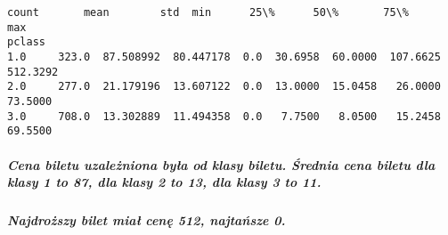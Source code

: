 \documentclass[11pt]{article}
\makeatletter
\newcommand{\boxspacing}{\kern\kvtcb@left@rule\kern\kvtcb@boxsep}
\newcommand{\prompt}[4]{
        {\ttfamily\llap{{\color{#2}[#3]:\hspace{3pt}#4}}\vspace{-\baselineskip}}
    }
\makeatother
\begin{document}
            \begin{tcolorbox}[breakable, size=fbox, boxrule=.5pt, pad at break*=1mm, opacityfill=0]
\prompt{Out}{outcolor}{92}{\boxspacing}
\begin{Verbatim}[commandchars=\\\{\}]
        count       mean        std  min      25\%      50\%       75\%       max
pclass
1.0     323.0  87.508992  80.447178  0.0  30.6958  60.0000  107.6625  512.3292
2.0     277.0  21.179196  13.607122  0.0  13.0000  15.0458   26.0000   73.5000
3.0     708.0  13.302889  11.494358  0.0   7.7500   8.0500   15.2458   69.5500
\end{Verbatim}
\end{tcolorbox}
        
    \subparagraph{Cena biletu uzależniona była od klasy biletu. Średnia cena
biletu dla klasy 1 to 87, dla klasy 2 to 13, dla klasy 3 to
11.}\label{cena-biletu-uzaleux17cniona-byux142a-od-klasy-biletu.-ux15brednia-cena-biletu-dla-klasy-1-to-87-dla-klasy-2-to-13-dla-klasy-3-to-11.}

\subparagraph{Najdroższy bilet miał cenę 512, najtańsze
0.}\label{najdroux17cszy-bilet-miaux142-cenux119-512-najtaux144sze-0.}
\end{document}
